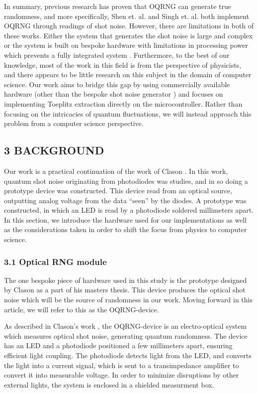 \documentclass{sigchi}
\begin{document}
In summary, previous research has proven that OQRNG can generate true randomness, and more specifically, Shen et. al. \cite{contender1} and Singh et. al. \cite{singh} both implement OQRNG through readings of shot noise. However, there are limitations in both of these works. Either the system that generates the shot noise is large and complex \cite{contender1} or the system is built on bespoke hardware with limitations in processing power which prevents a fully integrated system \cite{singh}. Furthermore, to the best of our knowledge, most of the work in this field is from the perspective of physicists, and there appears to be little research on this subject in the domain of computer science. Our work aims to bridge this gap by using commercially available hardware (other than the bespoke shot noise generator \cite{Clason2023}) and focuses on implementing Toeplitz extraction directly on the microcontroller. Rather than focusing on the intricacies of quantum fluctuations, we will instead approach this problem from a computer science perspective.

\subsection{3 BACKGROUND}\label{background}

Our work is a practical continuation of the work of Clason \cite{Clason2023}. In this work, quantum shot noise originating from photodiodes was studies, and in so doing a prototype device was constructed. This device read from an optical source, outputting analog voltage from the data ``seen'' by the diodes. A prototype was constructed, in which an LED is read by a photodiode soldered millimeters apart. In this section, we introduce the hardware used for our implementations as well as the considerations taken in order to shift the focus from physics to computer science.

\subsubsection{3.1 Optical RNG module}\label{optical-rng-module}

The one bespoke piece of hardware used in this study is the prototype designed by Clason \cite{Clason2023} as a part of his masters thesis. This device produces the optical shot noise which will be the source of randomness in our work. Moving forward in this article, we will refer to this as the OQRNG-device.

As described in Clason's work \cite{Clason2023}, the OQRNG-device is an electro-optical system which measures optical shot noise, generating quantum randomness. The device has an LED and a photodiode positioned a few millimeters apart, ensuring efficient light coupling. The photodiode detects light from the LED, and converts the light into a current signal, which is sent to a transimpedance amplifier to convert it into measurable voltage. In order to minimize disruptions by other external lights, the system is enclosed in a shielded measurment box.
\end{document}
